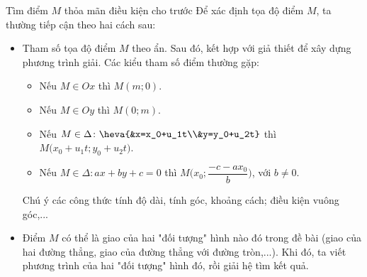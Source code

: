\begin{dang}{Tìm điểm $M$ thỏa mãn điều kiện cho trước}
	Để xác định tọa độ điểm $M$, ta thường tiếp cận theo hai cách sau:
	\begin{itemize}
		\item [\iconMT]  Tham số tọa độ điểm $M$ theo ẩn. Sau đó, kết hợp với giả thiết để xây dựng phương trình giải. Các kiểu tham số điểm thường gặp:
		\begin{tcolorbox}[colframe=orange,colback=red!2!white,boxrule=0.2mm]
			\begin{itemize}
				\item Nếu $M \in Ox$ thì $M(m;0)$.
				\item Nếu $M \in Oy$ thì $M(0;m)$.
				\item Nếu $M \in \Delta \colon \heva{&x=x_0+u_1t\\&y=y_0+u_2t}$ thì $M\bigg(x_0+u_1t;y_0+u_2t\bigg)$.
				\item Nếu $M \in \Delta \colon ax+by+c=0$ thì $M\bigg(x_0;\dfrac{-c-ax_0}{b}\bigg)$, với $b \ne 0$.
			\end{itemize}
		\end{tcolorbox}
		\begin{luuy}
			Chú ý các công thức tính độ dài, tính góc, khoảng cách; điều kiện vuông góc,...
		\end{luuy}
		\item [\iconMT]  Điểm $M$ có thể là giao của hai "đối tượng" hình nào đó trong đề bài (giao của hai đường thẳng, giao của đường thẳng với đường tròn,...). Khi đó, ta viết phương trình của hai "đối tượng" hình đó, rồi giải hệ tìm kết quả.
	\end{itemize}
\end{dang}